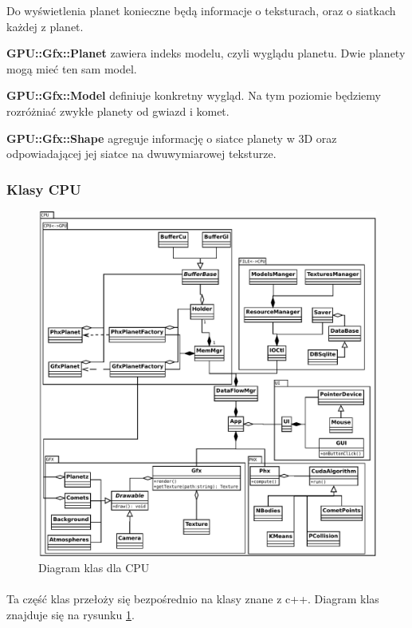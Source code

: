 Do wyświetlenia planet konieczne będą informacje o teksturach, oraz o siatkach każdej z planet.

\begin{description}
\item{\bf GPU::Gfx::Planet} zawiera indeks modelu, czyli wyglądu planetu. Dwie planety mogą mieć ten sam model.
\item{\bf GPU::Gfx::Model} definiuje konkretny wygląd. Na tym poziomie będziemy rozróżniać zwykłe planety od gwiazd i komet.
\item{\bf GPU::Gfx::Shape} agreguje informację o siatce planety w 3D oraz odpowiadającej jej siatce na dwuwymiarowej teksturze.
\end{description}

\subsubsection{Klasy CPU}

\begin{figure}[ht!]
	\centering
	\includegraphics[angle=0,width=\textwidth]{class_cpu.pdf}
	\caption{Diagram klas dla CPU}
	\label{fig:class_cpu}
\end{figure}

\paragraph{}
Ta część klas przełoży się bezpośrednio na klasy znane z c++. Diagram klas znajduje się na rysunku \ref{fig:class_cpu}.

